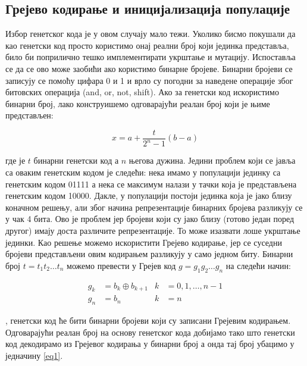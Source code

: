 \documentclass{article}
\begin{document}
\subsection{Грејево кодирање и иницијализација популације}
Избор генетског кода је у овом случају мало тежи. Уколико бисмо покушали да као генетски код
просто користимо онај реални број који јединка представља, било би поприлично тешко 
имплементирати укрштање и мутацију. Испоставља се да се ово може заобићи ако користимо
бинарне бројеве. Бинарни бројеви се записују се помоћу цифара 0 и 1 и врло су погодни за 
наведене операције због битовских операција (and, or, not, shift). Ако за генетски код
искористимо бинарни број, лако конструишемо одговарајући реалан број који је њиме представљен:

\begin{equation} \label{eq1}
    x = a + \frac{t}{2^n - 1} (b - a)
\end{equation}

\noindent где је $t$ бинарни генетски код а $n$ његова дужина. Једини проблем који се јавља са оваким
генетским кодом је следећи: нека имамо у популацији јединку са генетским кодом 01111 а нека се максимум
налази у тачки која је представљена генетским кодом 10000. Дакле, у популацији постоји
јединка која је јако близу коначном решењу, али због начина репрезентације бинарних 
бројева разликују се у чак 4 бита. Ово је проблем јер бројеви који су јако близу 
(готово један поред другог) имају доста различите репрезентације. То може изазвати лоше укрштање јединки. 
Као решење можемо искористити Грејево кодирање, јер се суседни бројеви представљени овим кодирањем 
разликују у само једном биту. Бинарни број $t = t_1 t_2 \dots t_n$ можемо превести у 
Грејев код $g = g_1 g_2 \dots g_n$ на следећи начин: 

\begin{align*}
    g_k &= b_k \oplus b_{k + 1} & k &= 0, 1, \dots, n - 1 \\
    g_n &= b_n                   &   k &= n
\end{align*}

, генетски код ће бити бинарни бројеви који су записани Грејевим кодирањем. 
Одговарајући реалан број на основу генетског кода добијамо тако што генетски код 
декодирамо из Грејевог кодирања у бинарни број а онда тај број убацимо у једначину \ref*{eq1}.
\end{document}
